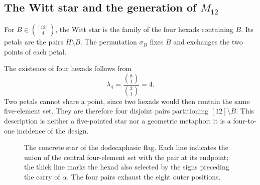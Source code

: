 

\subsection{The Witt star and the generation of \texorpdfstring{$M_{12}$}{M12}}
\label{x_reciprocidad:exc:estrella}

\begin{definition}
\label{x_reciprocidad:exc:def-estrella}
For $B\in\binom{[12]}4$, the Witt star is the family of the
four hexads containing $B$. Its petals are the pairs $H\setminus B$.
The permutation $\sigma_B$ fixes $B$ and exchanges the two points of each
petal.
\end{definition}

The existence of four hexads follows from
\[
 \lambda_4=\frac{\binom81}{\binom21}=4.
\]
Two petals cannot share a point, since two hexads would then
contain the same five-element set. They are therefore four disjoint pairs
partitioning $[12]\setminus B$. This description is neither a five-pointed
star nor a geometric metaphor: it is a four-to-one incidence
of the design.

\begin{figure}[htbp]
\centering
{}
\caption{The concrete star of the dodecaphasic flag. Each line
indicates the union of the central four-element set with the pair at its endpoint; the
thick line marks the hexad also selected by the signs
preceding the carry of $\alpha$. The four pairs exhaust the eight
outer positions.}
\label{x_reciprocidad:exc:fig-estrella}
\end{figure}

